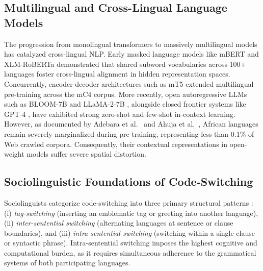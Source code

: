 \documentclass[11pt,a4paper]{article}
\begin{document}
\subsection{Multilingual and Cross-Lingual Language Models}
The progression from monolingual transformers \cite{vaswani2017attention} to massively multilingual models has catalyzed cross-lingual NLP. Early masked language models like mBERT \cite{devlin2019bert} and XLM-RoBERTa \cite{conneau2020xlmr} demonstrated that shared subword vocabularies across 100+ languages foster cross-lingual alignment in hidden representation spaces. Concurrently, encoder-decoder architectures such as mT5 \cite{xue2021mt5} extended multilingual pre-training across the mC4 corpus. More recently, open autoregressive LLMs such as BLOOM-7B \cite{lescao2022bloom} and LLaMA-2-7B \cite{touvron2023llama2}, alongside closed frontier systems like GPT-4 \cite{achiam2023gpt4}, have exhibited strong zero-shot and few-shot in-context learning. However, as documented by Adebara et al.\ \cite{adebara2022african} and Ahuja et al.\ \cite{ahuja2023mega}, African languages remain severely marginalized during pre-training, representing less than 0.1\% of Web crawled corpora. Consequently, their contextual representations in open-weight models suffer severe spatial distortion.

\subsection{Sociolinguistic Foundations of Code-Switching}
Sociolinguists categorize code-switching into three primary structural patterns \cite{muysken2000bilingual, poplack1980sometimes}: (i) \textit{tag-switching} (inserting an emblematic tag or greeting into another language), (ii) \textit{inter-sentential switching} (alternating languages at sentence or clause boundaries), and (iii) \textit{intra-sentential switching} (switching within a single clause or syntactic phrase). Intra-sentential switching imposes the highest cognitive and computational burden, as it requires simultaneous adherence to the grammatical systems of both participating languages.
\end{document}
